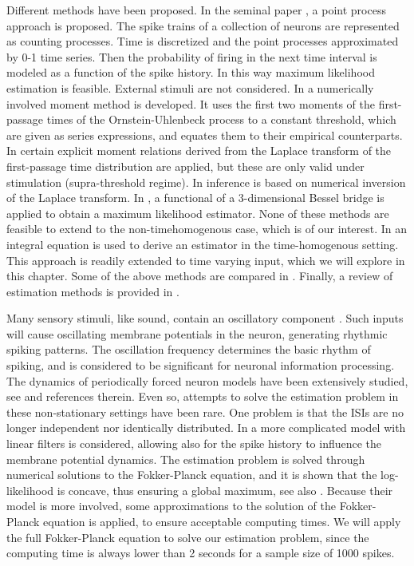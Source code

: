 Different methods have been
proposed. In the seminal paper \cite{Brillinger1988}, a point process approach
is proposed. The spike trains of a collection of neurons are 
represented as counting processes. Time is discretized and the point processes
approximated by 0-1 time series. Then the probability of firing in the
next time interval is modeled as a function of the
spike history. In this way maximum likelihood
estimation is feasible. External stimuli are not considered. 
In \cite{Inoue1995} a numerically involved moment method is
developed. It uses the first two moments of the first-passage times of
the Ornstein-Uhlenbeck process to a constant threshold, which are
given as series expressions, and equates them to their empirical
counterparts. In
\cite{DitlevsenLansky2005,DitlevsenLansky2006} certain explicit 
moment relations derived from the Laplace transform of the first-passage time
distribution are applied, but these are only valid under 
stimulation (supra-threshold regime). In
\cite{MullowneyIyengar2008} inference is based on numerical inversion of the Laplace transform. In \cite{Zhangetal2009}, a
functional of a 3-dimensional Bessel bridge is applied to obtain a maximum
likelihood estimator. None of these methods
are feasible to extend to the
non-timehomogenous case, which is of our interest. In \cite{Ditlevsen2008,Ditlevsen2007} an
integral equation is used to derive an estimator in the
time-homogenous setting. This approach is readily extended to time
varying input, which we will explore in this chapter. Some of the above methods are compared in
\cite{Ditlevsen2008a}. Finally, a review of estimation methods is provided in
\cite{Lansky2008}. 

Many sensory stimuli, like sound, contain an oscillatory component
\cite{Braunetal1994,Chacron2000}. Such inputs will cause oscillating membrane
potentials in the neuron, generating rhythmic spiking patterns. The oscillation
frequency determines the basic rhythm of spiking, and is considered to be
significant for neuronal information processing. The dynamics of periodically
forced neuron models have been extensively studied, see
\cite{Bulsaraetal1996,Burkitt2006b,Lansky1997,Longtingetal1994,SacerdoteGiraudo2013,Shimokawa2000}
and references therein. Even so, attempts to solve the estimation problem in
these non-stationary settings have been rare. One problem is that the ISIs are
no longer independent nor identically distributed. In
\cite{Paninski2004} a more complicated model with linear filters is considered, allowing
also for the spike history to influence the membrane potential
dynamics. The estimation problem is solved through numerical solutions to the
Fokker-Planck equation, and it is shown that the log-likelihood is
concave, thus ensuring a global maximum, see also
\cite{Dong2011,Sirovich2011a}. Because their model is more involved,
some approximations to the solution of the Fokker-Planck equation is
applied, to ensure acceptable computing times. We will apply the full 
Fokker-Planck equation to solve our estimation problem, since the
computing time is always lower than 2 seconds for a sample size of
1000 spikes.   
  

